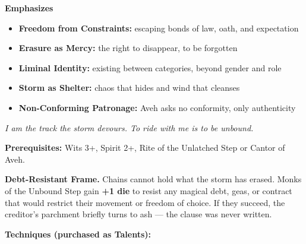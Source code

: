 \noindent\textbf{Emphasizes}
\begin{itemize}
  \item \textbf{Freedom from Constraints:} escaping bonds of law, oath, and expectation
  \item \textbf{Erasure as Mercy:} the right to disappear, to be forgotten
  \item \textbf{Liminal Identity:} existing between categories, beyond gender and role
  \item \textbf{Storm as Shelter:} chaos that hides and wind that cleanses
  \item \textbf{Non-Conforming Patronage:} Aveh asks no conformity, only authenticity
\end{itemize}

\begin{tcolorbox}[colback=black!5,colframe=gray!70!white,title=\textbf{Unbound Step (Aveh)},breakable]
  \emph{I am the track the storm devours. To ride with me is to be unbound.}

  \vspace{2mm}
  \noindent\textbf{Prerequisites:} Wits 3+, Spirit 2+, Rite of the Unlatched Step or Cantor of Aveh.

  \vspace{2mm}
  \noindent\textbf{Debt-Resistant Frame.} Chains cannot hold what the storm has erased. Monks of the Unbound Step gain \textbf{+1 die} to resist any magical debt, geas, or contract that would restrict their movement or freedom of choice. If they succeed, the creditor's parchment briefly turns to ash --- the clause was never written.

  \vspace{2mm}
  \noindent\textbf{Techniques (purchased as Talents):}


\end{tcolorbox}
